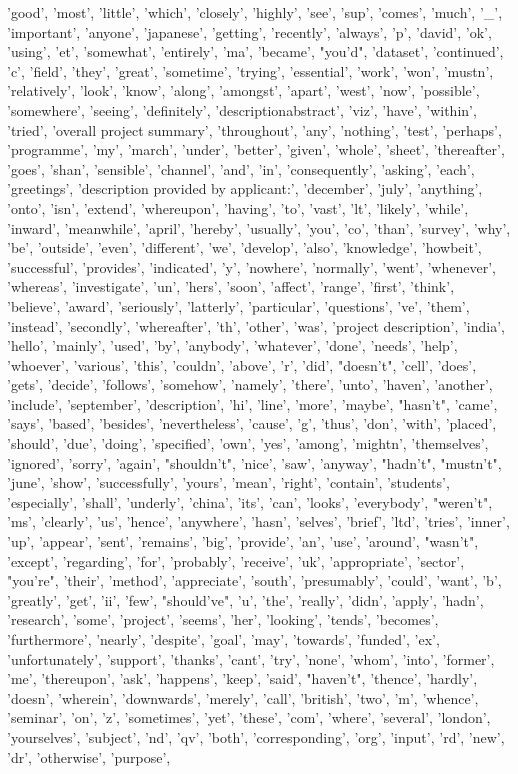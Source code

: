 'good', 'most', 'little', 'which', 'closely', 'highly', 'see', 'sup', 'comes', 'much', '\_', 'important', 'anyone', 'japanese', 'getting', 'recently', 'always', 'p', 'david', 'ok', 'using', 'et', 'somewhat', 'entirely', 'ma', 'became', "you'd", 'dataset', 'continued', 'c', 'field', 'they', 'great', 'sometime', 'trying', 'essential', 'work', 'won', 'mustn', 'relatively', 'look', 'know', 'along', 'amongst', 'apart', 'west', 'now', 'possible', 'somewhere', 'seeing', 'definitely', 'descriptionabstract', 'viz', 'have', 'within', 'tried', 'overall project summary', 'throughout', 'any', 'nothing', 'test', 'perhaps', 'programme', 'my', 'march', 'under', 'better', 'given', 'whole', 'sheet', 'thereafter', 'goes', 'shan', 'sensible', 'channel', 'and', 'in', 'consequently', 'asking', 'each', 'greetings', 'description provided by applicant:', 'december', 'july', 'anything', 'onto', 'isn', 'extend', 'whereupon', 'having', 'to', 'vast', 'lt', 'likely', 'while', 'inward', 'meanwhile', 'april', 'hereby', 'usually', 'you', 'co', 'than', 'survey', 'why', 'be', 'outside', 'even', 'different', 'we', 'develop', 'also', 'knowledge', 'howbeit', 'successful', 'provides', 'indicated', 'y', 'nowhere', 'normally', 'went', 'whenever', 'whereas', 'investigate', 'un', 'hers', 'soon', 'affect', 'range', 'first', 'think', 'believe', 'award', 'seriously', 'latterly', 'particular', 'questions', 've', 'them', 'instead', 'secondly', 'whereafter', 'th', 'other', 'was', 'project description', 'india', 'hello', 'mainly', 'used', 'by', 'anybody', 'whatever', 'done', 'needs', 'help', 'whoever', 'various', 'this', 'couldn', 'above', 'r', 'did', "doesn't", 'cell', 'does', 'gets', 'decide', 'follows', 'somehow', 'namely', 'there', 'unto', 'haven', 'another', 'include', 'september', 'description', 'hi', 'line', 'more', 'maybe', "hasn't", 'came', 'says', 'based', 'besides', 'nevertheless', 'cause', 'g', 'thus', 'don', 'with', 'placed', 'should', 'due', 'doing', 'specified', 'own', 'yes', 'among', 'mightn', 'themselves', 'ignored', 'sorry', 'again', "shouldn't", 'nice', 'saw', 'anyway', "hadn't", "mustn't", 'june', 'show', 'successfully', 'yours', 'mean', 'right', 'contain', 'students', 'especially', 'shall', 'underly', 'china', 'its', 'can', 'looks', 'everybody', "weren't", 'ms', 'clearly', 'us', 'hence', 'anywhere', 'hasn', 'selves', 'brief', 'ltd', 'tries', 'inner', 'up', 'appear', 'sent', 'remains', 'big', 'provide', 'an', 'use', 'around', "wasn't", 'except', 'regarding', 'for', 'probably', 'receive', 'uk', 'appropriate', 'sector', "you're", 'their', 'method', 'appreciate', 'south', 'presumably', 'could', 'want', 'b', 'greatly', 'get', 'ii', 'few', "should've", 'u', 'the', 'really', 'didn', 'apply', 'hadn', 'research', 'some', 'project', 'seems', 'her', 'looking', 'tends', 'becomes', 'furthermore', 'nearly', 'despite', 'goal', 'may', 'towards', 'funded', 'ex', 'unfortunately', 'support', 'thanks', 'cant', 'try', 'none', 'whom', 'into', 'former', 'me', 'thereupon', 'ask', 'happens', 'keep', 'said', "haven't", 'thence', 'hardly', 'doesn', 'wherein', 'downwards', 'merely', 'call', 'british', 'two', 'm', 'whence', 'seminar', 'on', 'z', 'sometimes', 'yet', 'these', 'com', 'where', 'several', 'london', 'yourselves', 'subject', 'nd', 'qv', 'both', 'corresponding', 'org', 'input', 'rd', 'new', 'dr', 'otherwise', 'purpose', 